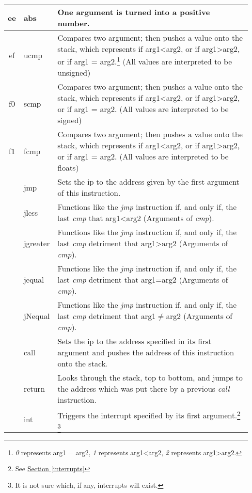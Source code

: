 \documentclass[10pt,a4paper]{article}
\makeatletter
\newcommand\footnoteref[1]{\protected@xdef\@thefnmark{\ref{#1}}\@footnotemark}
\makeatother
\begin{document}
\begin{longtable}[c]{c|l|p{9cm}}
		\hline
		\hex ee & abs & One argument is turned into a positive number. \\
		\hline	
		\hex ef & ucmp & Compares two argument; then pushes a value onto the stack, which represents if arg1\textless arg2, or if arg1\textgreater arg2, or if arg1 = arg2.\footnote{\label{cmp_footnote} \textit{0} represents arg1 = arg2, \textit{1} represents arg1\textless arg2, \textit{2} represents arg1\textgreater arg2.} (All values are interpreted to be unsigned) \\
		\hline
		\hex f0 & scmp & Compares two argument; then pushes a value onto the stack, which represents if arg1\textless arg2, or if arg1\textgreater arg2, or if arg1 = arg2.\footnoteref{cmp_footnote} (All values are interpreted to be signed) \\
		\hline
		\hex f1 & fcmp & Compares two argument; then pushes a value onto the stack, which represents if arg1\textless arg2, or if arg1\textgreater arg2, or if arg1 = arg2.\footnoteref{cmp_footnote} (All values are interpreted to be floats) \\
		\hline		
		\hline
		\hex 01 & jmp & Sets the ip to the address given by the first argument of this instruction. \\
		\hline
		\hex 02 & jless & Functions like the \textit{jmp} instruction if, and only if, the last \textit{cmp}  that arg1\textless arg2 (Arguments of \textit{cmp}). \\
		\hline
		\hex 03 & jgreater & Functions like the \textit{jmp} instruction if, and only if, the last \textit{cmp} detriment that arg1\textgreater arg2 (Arguments of \textit{cmp}). \\
		\hline
		\hex 04 & jequal & Functions like the \textit{jmp} instruction if, and only if, the last \textit{cmp} detriment that arg1=arg2 (Arguments of \textit{cmp}). \\
		\hline
		\hex 05 & jNequal & Functions like the \textit{jmp} instruction if, and only if, the last \textit{cmp} detriment that arg1\(\neq \)arg2 (Arguments of \textit{cmp}). \\
		\hline
		\hex 06 & call & Sets the ip to the address specified in its first argument and pushes the address of this instruction onto the stack. \\
		\hline
		\hex 07 & return & Looks through the stack, top to bottom, and jumps to the address which was put there by a previous \textit{call} instruction. \\
		\hline
		\hline
		\hex 10 & int & Triggers the interrupt specified by its first argument.\footnote{See \hyperref[interrupts]{Section \ref*{interrupts}}}\,\footnote{It is not sure which, if any, interrupts will exist.} \\

\end{longtable}
\end{document}
